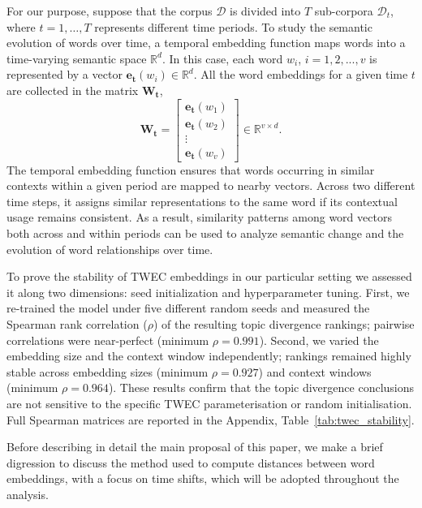 For our purpose, suppose that the corpus $\mathcal{D}$ is divided into $T$ sub-corpora $\mathcal{D}_t$, where $t = 1, \dots, T$ represents different time periods. To study the semantic evolution of words over time, a temporal embedding function maps words into a time-varying semantic space $\mathbb{R}^d$. In this case, each word $w_i$, $i=1,2, ..., v$ is represented by a vector $\mathbf{e_t}(w_i) \in \mathbb{R}^d$. All the word embeddings for a given time $t$ are collected in the matrix $\mathbf{W_t}$,
\begin{equation}\label{matrix_eq}
\mathbf{W_t} =
\begin{bmatrix}
\mathbf{e_t}(w_1) \\
\mathbf{e_t}(w_2) \\
\vdots \\
\mathbf{e_t}(w_v)
\end{bmatrix} \in \mathbf{\mathbb{R}}^{v \times d}. 
\end{equation}
The temporal embedding function ensures that words occurring in similar contexts within a given period are mapped to nearby vectors. Across two different time steps, it assigns similar representations to the same word if its contextual usage remains consistent. As a result, similarity patterns among word vectors both across and within periods can be used to analyze semantic change and the evolution of word relationships over time.

To prove the stability of TWEC embeddings in our particular setting we assessed it along two dimensions: seed initialization and hyperparameter tuning. First, we re-trained the model under five different random seeds and measured the Spearman rank correlation ($\rho$) of the resulting topic divergence rankings; pairwise correlations were near-perfect (minimum $\rho = 0.991$). Second, we varied the embedding size and the context window independently; rankings remained highly stable across embedding sizes (minimum $\rho = 0.927$) and context windows (minimum $\rho = 0.964$). These results confirm that the topic divergence conclusions are not sensitive to the specific TWEC parameterisation or random initialisation. Full Spearman matrices are reported in the Appendix, Table~\ref{tab:twec_stability}.


Before describing in detail the main proposal of this paper, we make a brief digression to discuss the method used to compute distances between word embeddings, with a focus on time shifts, which will be adopted throughout the analysis.

